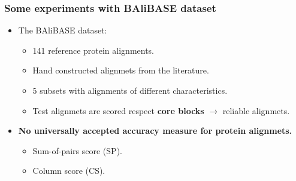 \begin{frame}
    \frametitle{Some experiments with BAliBASE dataset}
    \begin{itemize}
        \item The BAliBASE dataset:
        \begin{itemize}
            \item 141 reference protein alignments.
            \item Hand constructed alignmets from the literature.
            \item 5 subsets with alignments of different characteristics.   
            \item Test alignmets are scored respect \textbf{core blocks} $\rightarrow$ reliable alignmets.         
        \end{itemize}
        \item \textbf{No universally accepted accuracy measure for protein alignmets.}
        \begin{itemize}
            \item Sum-of-pairs score (SP).
            \item Column score (CS).            
        \end{itemize}
    \end{itemize}
\end{frame}

